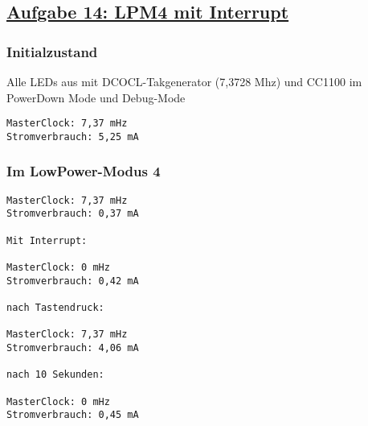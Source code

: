 \subsection*
{\href{http://cst.mi.fu-berlin.de/intern/19606-P-MPP/Aufgaben/040501.html}
{Aufgabe 14: LPM4 mit Interrupt}}

\subsubsection*{Initialzustand}
Alle LEDs aus mit DCOCL-Takgenerator (7,3728 Mhz) und CC1100 im PowerDown Mode und Debug-Mode

\begin{verbatim}
MasterClock: 7,37 mHz
Stromverbrauch: 5,25 mA
\end{verbatim}

\subsubsection*{Im LowPower-Modus 4}
\begin{verbatim}
MasterClock: 7,37 mHz
Stromverbrauch: 0,37 mA

Mit Interrupt:

MasterClock: 0 mHz
Stromverbrauch: 0,42 mA

nach Tastendruck:

MasterClock: 7,37 mHz
Stromverbrauch: 4,06 mA

nach 10 Sekunden:

MasterClock: 0 mHz
Stromverbrauch: 0,45 mA
\end{verbatim}
